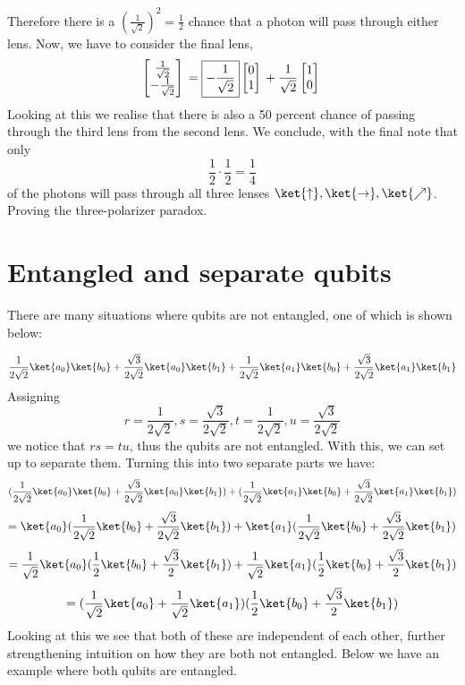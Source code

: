 \documentclass{article}
\begin{document}
    Therefore there is a $(\frac{1}{\sqrt{2}})^{2} = \frac{1}{2}$ chance that a photon will pass through either lens. Now, we have to consider the final lens, $$\begin{bmatrix}
        \frac{1}{\sqrt{2}}\\
        -\frac{1}{\sqrt{2}}
    \end{bmatrix}\\ = \boxed{-\frac{1}{\sqrt{2}}}\begin{bmatrix}
        0\\
        1
    \end{bmatrix}\\+ \frac{1}{\sqrt{2}}\begin{bmatrix}
        1\\
        0
    \end{bmatrix}\\$$   Looking at this we realise that there is also a 50 percent chance of passing through the third lens from the second lens. We conclude, with the final note that only $$\frac{1}{2} \cdot \frac{1}{2} = \boxed{\frac{1}{4}}$$ of the photons will pass through all three lenses $\ket{\uparrow}, \ket{\rightarrow}, \ket{\nearrow}$. Proving the three-polarizer paradox.

\section{Entangled and separate qubits}

There are many situations where qubits are not entangled, one of which is shown below:

$$\frac{1}{2\sqrt{2}}\ket{a_{0}}\ket{b_{0}}+\frac{\sqrt{3}}{2\sqrt{2}}\ket{a_{0}}\ket{b_{1}}+\frac{1}{2\sqrt{2}}\ket{a_{1}}\ket{b_{0}}+\frac{\sqrt{3}}{2\sqrt{2}}\ket{a_{1}}\ket{b_{1}}$$
Assigning
$$r=\frac{1}{2\sqrt{2}}, s=\frac{\sqrt{3}}{2\sqrt{2}}, t=\frac{1}{2\sqrt{2}}, u=\frac{\sqrt{3}}{2\sqrt{2}}$$ we notice that $rs=tu$, thus the qubits are not entangled. With this, we can set up to separate them. Turning this into two separate parts we have: 
$$(\frac{1}{2\sqrt{2}}\ket{a_{0}}\ket{b_{0}}+\frac{\sqrt{3}}{2\sqrt{2}}\ket{a_{0}}\ket{b_{1}})+(\frac{1}{2\sqrt{2}}\ket{a_{1}}\ket{b_{0}}+\frac{\sqrt{3}}{2\sqrt{2}}\ket{a_{1}}\ket{b_{1}})$$
$$=\ket{a_{0}}(\frac{1}{2\sqrt{2}}\ket{b_{0}}+\frac{\sqrt{3}}{2\sqrt{2}}\ket{b_{1}})+\ket{a_{1}}(\frac{1}{2\sqrt{2}}\ket{b_{0}}+\frac{\sqrt{3}}{2\sqrt{2}}\ket{b_{1}})$$
$$=\frac{1}{\sqrt{2}}\ket{a_{0}}(\frac{1}{2}\ket{b_{0}}+\frac{\sqrt{3}}{2}\ket{b_{1}})+\frac{1}{\sqrt{2}}\ket{a_{1}}(\frac{1}{2}\ket{b_{0}}+\frac{\sqrt{3}}{2}\ket{b_{1}})$$
$$=(\frac{1}{\sqrt{2}}\ket{a_{0}}+\frac{1}{\sqrt{2}}\ket{a_{1}})(\frac{1}{2}\ket{b_{0}}+\frac{\sqrt{3}}{2}\ket{b_{1}})$$
Looking at this we see that both of these are independent of each other, further strengthening intuition on how they are both not entangled. Below we have an example where both qubits are entangled.
\end{document}
